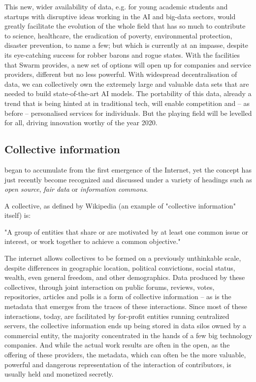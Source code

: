 This new, wider availability of data, e.g. for young academic students and startups with disruptive ideas working in the AI and big-data sectors, would greatly facilitate the evolution of the whole field that has so much to contribute to science, healthcare, the eradication of poverty, environmental protection, disaster prevention, to name a few; but which is currently at an impasse, despite its eye-catching success for robber barons and rogue states. With the facilities that Swarm provides, a new set of options will open up for companies and service providers, different but no less powerful. With widespread decentralisation of data, we can collectively own the extremely large and valuable data sets that are needed to build state-of-the-art AI models. The portability of this data, already a trend that is being hinted at in traditional tech, will enable competition and – as before – personalised services for individuals. But the playing field will be levelled for all, driving innovation worthy of the year 2020. 



\subsection{Collective information \statusgreen}\label{sec:collective_information}

 began to accumulate from the first emergence of the Internet, yet the concept has just recently become recognized and discussed under a variety of headings such as  \emph{open source}, \emph{fair data} or \emph{information commons}.

A collective, as defined by Wikipedia (an example of "collective information" itself) is:
\begin{displayquote}
"A group of entities that share or are motivated by at least one common issue or interest, or work together to achieve a common objective." 
\end{displayquote}
The internet allows collectives to be formed on a previously unthinkable scale, despite differences in geographic location, political convictions, social status, wealth, even general freedom, and other demographics. Data produced by these collectives, through joint interaction on public forums, reviews, votes, repositories, articles and polls is a form of collective information – as is the metadata that emerges from the traces of these interactions. Since most of these interactions, today, are facilitated by for-profit entities running centralized servers, the collective information ends up being stored in data silos owned by a commercial entity, the majority concentrated in the hands of a few big technology companies. And while the actual work results are often in the open, as the offering of these providers, the metadata, which can often be the more valuable, powerful and dangerous representation of the interaction of contributors, is usually held and monetized secretly.

